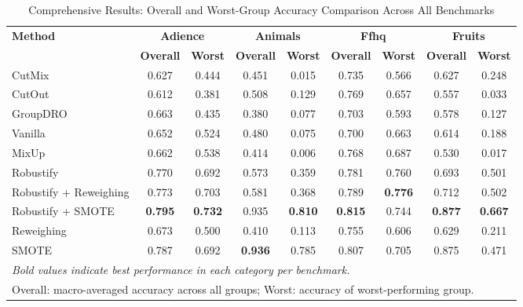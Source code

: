 \begin{table*}[htbp]
\centering
\caption{Comprehensive Results: Overall and Worst-Group Accuracy Comparison Across All Benchmarks}
\label{tab:comprehensive_results}
\begin{tabular}{lcccccccc}
\toprule
\multirow{2}{*}{\textbf{Method}} & \multicolumn{2}{c}{\textbf{Adience}} & \multicolumn{2}{c}{\textbf{Animals}} & \multicolumn{2}{c}{\textbf{Ffhq}} & \multicolumn{2}{c}{\textbf{Fruits}} \\
\cmidrule(lr){2-9}
& \textbf{Overall} & \textbf{Worst} & \textbf{Overall} & \textbf{Worst} & \textbf{Overall} & \textbf{Worst} & \textbf{Overall} & \textbf{Worst} \\
\midrule
CutMix & 0.627 & 0.444 & 0.451 & 0.015 & 0.735 & 0.566 & 0.627 & 0.248 \\
CutOut & 0.612 & 0.381 & 0.508 & 0.129 & 0.769 & 0.657 & 0.557 & 0.033 \\
GroupDRO & 0.663 & 0.435 & 0.380 & 0.077 & 0.703 & 0.593 & 0.578 & 0.127 \\
Vanilla & 0.652 & 0.524 & 0.480 & 0.075 & 0.700 & 0.663 & 0.614 & 0.188 \\
MixUp & 0.662 & 0.538 & 0.414 & 0.006 & 0.768 & 0.687 & 0.530 & 0.017 \\
Robustify & 0.770 & 0.692 & 0.573 & 0.359 & 0.781 & 0.760 & 0.693 & 0.501 \\
Robustify + Reweighing & 0.773 & 0.703 & 0.581 & 0.368 & 0.789 & \textbf{0.776} & 0.712 & 0.502 \\
Robustify + SMOTE & \textbf{0.795} & \textbf{0.732} & 0.935 & \textbf{0.810} & \textbf{0.815} & 0.744 & \textbf{0.877} & \textbf{0.667} \\
Reweighing & 0.673 & 0.500 & 0.410 & 0.113 & 0.755 & 0.606 & 0.629 & 0.211 \\
SMOTE & 0.787 & 0.692 & \textbf{0.936} & 0.785 & 0.807 & 0.705 & 0.875 & 0.471 \\
\bottomrule
\multicolumn{9}{l}{\footnotesize \textit{Bold values indicate best performance in each category per benchmark.}} \\
\multicolumn{9}{l}{\footnotesize Overall: macro-averaged accuracy across all groups; Worst: accuracy of worst-performing group.} \\
\end{tabular}
\end{table*}